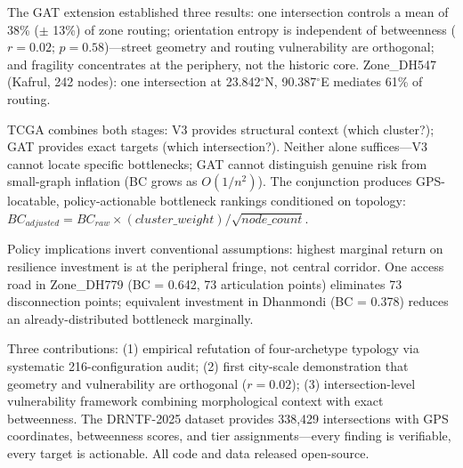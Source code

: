 \documentclass[sigconf, nonacm]{acmart}
\begin{document}
The GAT extension established three results: one intersection controls a mean of 38\% ($\pm$ 13\%) of zone routing; orientation entropy is independent of betweenness ($r = 0.02$; $p = 0.58$)—street geometry and routing vulnerability are orthogonal; and fragility concentrates at the periphery, not the historic core. Zone\_DH547 (Kafrul, 242 nodes): one intersection at 23.842$^\circ$N, 90.387$^\circ$E mediates 61\% of routing.

TCGA combines both stages: V3 provides structural context (which cluster?); GAT provides exact targets (which intersection?). Neither alone suffices—V3 cannot locate specific bottlenecks; GAT cannot distinguish genuine risk from small-graph inflation (BC grows as $O(1/n^2)$). The conjunction produces GPS-locatable, policy-actionable bottleneck rankings conditioned on topology: $BC_{adjusted} = BC_{raw} \times (cluster\_weight) / \sqrt{node\_count}$.

Policy implications invert conventional assumptions: highest marginal return on resilience investment is at the peripheral fringe, not central corridor. One access road in Zone\_DH779 (BC = 0.642, 73 articulation points) eliminates 73 disconnection points; equivalent investment in Dhanmondi (BC = 0.378) reduces an already-distributed bottleneck marginally.

Three contributions: (1) empirical refutation of four-archetype typology via systematic 216-configuration audit; (2) first city-scale demonstration that geometry and vulnerability are orthogonal ($r = 0.02$); (3) intersection-level vulnerability framework combining morphological context with exact betweenness. The DRNTF-2025 dataset \cite{galib2025} provides 338,429 intersections with GPS coordinates, betweenness scores, and tier assignments—every finding is verifiable, every target is actionable. All code and data released open-source.
\end{document}
